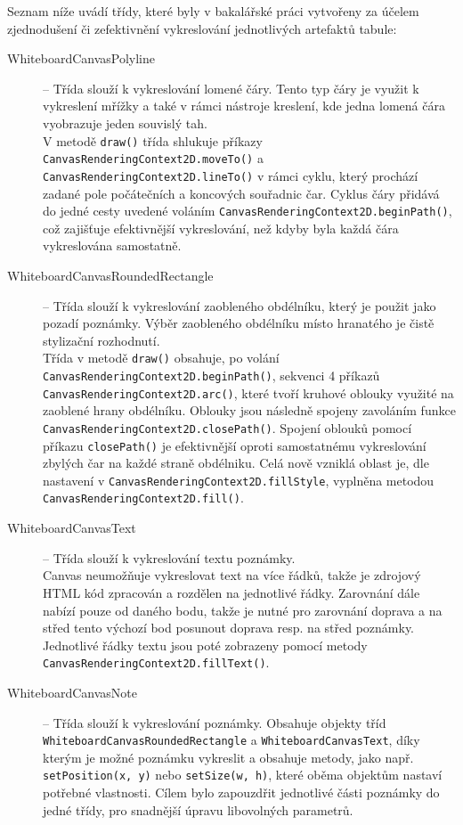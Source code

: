 Seznam níže uvádí třídy, které byly v bakalářské práci vytvořeny za účelem zjednodušení či zefektivnění vykreslování jednotlivých artefaktů tabule:
\begin{sloppypar*}
\begin{description}
	\item[WhiteboardCanvasPolyline] -- Třída slouží k vykreslování lomené čáry. Tento typ čáry je využit k vykreslení mřížky a také v rámci nástroje kreslení, kde jedna lomená čára vyobrazuje jeden souvislý tah.\\
	V metodě \texttt{draw()} třída shlukuje příkazy \texttt{CanvasRenderingContext2D.moveTo()} a \texttt{CanvasRenderingContext2D.lineTo()} v rámci cyklu, který prochází zadané pole počátečních a koncových souřadnic čar. Cyklus čáry přidává do jedné cesty uvedené voláním \texttt{CanvasRenderingContext2D.beginPath()}, což zajišťuje efektivnější vykreslování, než kdyby byla každá čára vykreslována samostatně. \cite{web:HTML5Rocks/CanvasImprovePerformance}
	\item[WhiteboardCanvasRoundedRectangle] -- Třída slouží k vykreslování zaobleného obdélníku, který je použit jako pozadí poznámky. Výběr zaobleného obdélníku místo hranatého je čistě stylizační rozhodnutí.\\
	Třída v metodě \texttt{draw()} obsahuje, po volání \texttt{CanvasRenderingContext2D.beginPath()}, sekvenci 4 příkazů \texttt{CanvasRenderingContext2D.arc()}, které tvoří kruhové oblouky využité na zaoblené hrany obdélníku. \cite{web:MDN/CanvasRenderingContext2D/arc} Oblouky jsou následně spojeny zavoláním funkce \texttt{CanvasRenderingContext2D.closePath()}. \cite{web:MDN/CanvasRenderingContext2D/closePath} Spojení oblouků pomocí příkazu \texttt{closePath()} je efektivnější oproti samostatnému vykreslování zbylých čar na každé straně obdélniku. Celá nově vzniklá oblast je, dle nastavení v \texttt{CanvasRenderingContext2D.fillStyle}, vyplněna metodou \texttt{CanvasRenderingContext2D.fill()}. \cite{web:MDN/CanvasRenderingContext2D/fill}
	\item[WhiteboardCanvasText] -- Třída slouží k vykreslování textu poznámky.\\
	Canvas neumožňuje vykreslovat text na více řádků, takže je zdrojový HTML kód zpracován a rozdělen na jednotlivé řádky. Zarovnání dále nabízí pouze od daného bodu, takže je nutné pro zarovnání doprava a na střed tento výchozí bod posunout doprava resp. na střed poznámky. Jednotlivé řádky textu jsou poté zobrazeny pomocí metody \texttt{CanvasRenderingContext2D.fillText()}.
	\item[WhiteboardCanvasNote] -- Třída slouží k vykreslování poznámky. Obsahuje objekty tříd \texttt{WhiteboardCanvasRoundedRectangle} a \texttt{WhiteboardCanvasText}, díky kterým je možné poznámku vykreslit a obsahuje metody, jako např. \texttt{setPosition(x, y)} nebo \texttt{setSize(w, h)}, které oběma objektům nastaví potřebné vlastnosti. Cílem bylo zapouzdřit jednotlivé části poznámky do jedné třídy, pro snadnější úpravu libovolných parametrů.

\end{description}
\end{sloppypar*}

